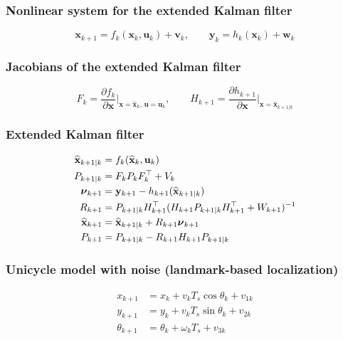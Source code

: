 \subsubsection{Nonlinear system for the extended Kalman filter}
\begin{equation*}
    \mathbf x_{k+1}=f_k(\mathbf x_k,\mathbf u_k)+\mathbf v_k,\qquad\mathbf y_k=h_k(\mathbf x_k)+\mathbf w_k
\end{equation*}

\subsubsection{Jacobians of the extended Kalman filter}
\begin{equation*}
    F_k=\frac{\partial f_k}{\partial\mathbf x}\bigg|_{\mathbf x=\widehat{\mathbf x}_k,\,\mathbf u=\mathbf u_k},\qquad H_{k+1}=\frac{\partial h_{k+1}}{\partial\mathbf x}\bigg|_{\mathbf x=\widehat{\mathbf x}_{k+1|k}}
\end{equation*}

\subsubsection{Extended Kalman filter}
\begin{align*}
    \widehat{\mathbf x}_{k+1|k}&=f_k(\widehat{\mathbf x}_k,\mathbf u_k)\\
    P_{k+1|k}&=F_kP_kF_k^\top+V_k\\
    {\boldsymbol{\nu}}_{k+1}&=\mathbf y_{k+1}-h_{k+1}(\widehat{\mathbf x}_{k+1|k})\\
    R_{k+1}&=P_{k+1|k}H_{k+1}^\top(H_{k+1}P_{k+1|k}H_{k+1}^\top+W_{k+1})^{-1}\\
    \widehat{\mathbf x}_{k+1}&=\widehat{\mathbf x}_{k+1|k}+R_{k+1}{\boldsymbol{\nu}}_{k+1}\\
    P_{k+1}&=P_{k+1|k}-R_{k+1}H_{k+1}P_{k+1|k}
\end{align*}

\subsubsection{Unicycle model with noise (landmark-based localization)}
\begin{align*}
    x_{k+1}&=x_k+v_kT_s\cos\theta_k+v_{1k}\\
    y_{k+1}&=y_k+v_kT_s\sin\theta_k+v_{2k}\\
    \theta_{k+1}&=\theta_k+\omega_kT_s+v_{3k}
\end{align*}

